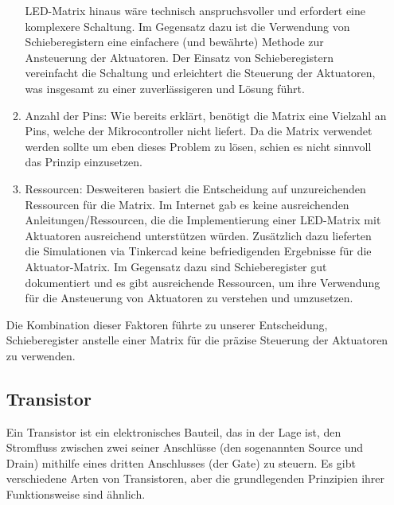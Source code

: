 \begin{enumerate}
\begin{enumerate}
	LED-Matrix hinaus wäre technisch anspruchsvoller und erfordert eine komplexere Schaltung. Im Gegensatz dazu ist die
	Verwendung von Schieberegistern eine einfachere (und bewährte) Methode zur Ansteuerung der Aktuatoren. Der Einsatz von
	Schieberegistern vereinfacht die Schaltung und erleichtert die Steuerung der Aktuatoren, was insgesamt zu einer
	zuverlässigeren und Lösung führt.
	\item Anzahl der Pins: Wie bereits erklärt, benötigt die Matrix eine Vielzahl an Pins, welche der Mikrocontroller
	nicht liefert. Da die Matrix verwendet werden sollte um eben dieses Problem zu lösen, schien es nicht sinnvoll
	das Prinzip einzusetzen.
	\item Ressourcen: Desweiteren basiert die Entscheidung auf unzureichenden Ressourcen für die Matrix. Im Internet gab es
	keine ausreichenden Anleitungen/Ressourcen, die die Implementierung einer LED-Matrix mit Aktuatoren ausreichend
	unterstützen würden. Zusätzlich dazu lieferten die Simulationen via Tinkercad keine befriedigenden Ergebnisse
	für die Aktuator-Matrix.
	Im Gegensatz dazu sind Schieberegister gut dokumentiert und es gibt ausreichende Ressourcen, um ihre
	Verwendung für die Ansteuerung von Aktuatoren zu verstehen und umzusetzen.
\end{enumerate}
Die Kombination dieser Faktoren führte zu
unserer Entscheidung, Schieberegister anstelle einer Matrix für die präzise Steuerung der Aktuatoren zu verwenden.


\subsection{Transistor}
Ein Transistor ist ein elektronisches Bauteil, das in der Lage ist, den Stromfluss zwischen zwei seiner Anschlüsse
(den sogenannten Source und Drain) mithilfe eines dritten Anschlusses (der Gate) zu steuern. Es gibt verschiedene Arten
von Transistoren, aber die grundlegenden Prinzipien ihrer Funktionsweise sind ähnlich.\newline


\end{enumerate}
